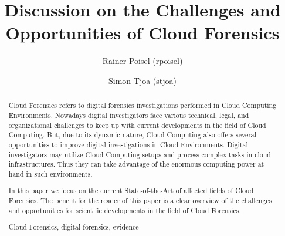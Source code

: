 \documentclass[runningheads,a4paper]{llncs}
\newcommand{\keywords}[1]{\par\addvspace\baselineskip
\noindent\keywordname\enspace\ignorespaces#1}
\begin{document}
\mainmatter  %

\title{Discussion on the Challenges and Opportunities of Cloud Forensics}


%
%
\author{Rainer Poisel (rpoisel)\and Simon Tjoa (stjoa)}
%


%
%

\maketitle


\begin{abstract}
Cloud Forensics refers to digital forensics investigations performed in Cloud Computing Environments. Nowadays digital investigators face various technical, legal, and organizational challenges to keep up with current developments in the field of Cloud Computing. But, due to its dynamic nature, Cloud Computing also offers several opportunities to improve digital investigations in Cloud Environments. Digital investigators may utilize Cloud Computing setups and process complex tasks in cloud infrastructures. Thus they can take advantage of the enormous computing power at hand in such environments. 

In this paper we focus on the current State-of-the-Art of affected fields of Cloud Forensics. The benefit for the reader of this paper is a clear overview of the challenges and opportunities for scientific developments in the field of Cloud Forensics. 
\keywords{Cloud Forensics, digital forensics, evidence}
\end{abstract}
\end{document}
